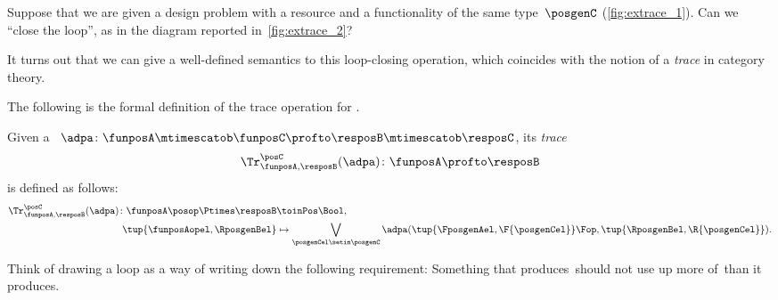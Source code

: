 \begin{marginfigure}
    \centering
    \caption{Design problem with a resource and a functionality of the same type.
    }
    \label{fig:extrace_1}
\end{marginfigure}

\begin{marginfigure}
    \centering
    \caption{Closing the loop in the design problem.}
    \label{fig:extrace_2}
\end{marginfigure}

Suppose that we are given a design problem with a resource and a functionality of the same type~$\posgenC$ (\cref{fig:extrace_1}).
Can we ``close the loop'', as in the diagram reported in~\cref{fig:extrace_2}?

It turns out that we can give a well-defined semantics to this loop-closing operation, which coincides with the notion of a \emph{trace} in category theory.

The following is the formal definition of the trace operation for .

\begin{definition}
    \label{def:dp-trace}
    Given a ~$\adpa\colon \funposA \mtimescatob \funposC \profto \resposB \mtimescatob \resposC$, its \emph{trace}
    \begin{equation}
        \Tr_{\funposA,\resposB}^\posC(\adpa) \colon \funposA \profto \resposB
    \end{equation}
    is defined as follows:
    \begin{equation}
        \label{eq:tracedef}
        \begin{aligned}
            \Tr_{\funposA,\resposB}^\posC(\adpa) \colon \funposA\posop \Ptimes \resposB & \toinPos \Bool, \\
            \tup{\funposAopel, \RposgenBel}                                             & \mapsto \bigvee_{\posgenCel \setin \posgenC}
            \adpa(\tup{\FposgenAel, \F{\posgenCel}}\Fop,
            \tup{\RposgenBel, \R{\posgenCel}}).
        \end{aligned}
    \end{equation}
\end{definition}

Think of drawing a loop as a way of writing down the following requirement:
Something that produces~\posC should not use up more of~\posC than it produces.

